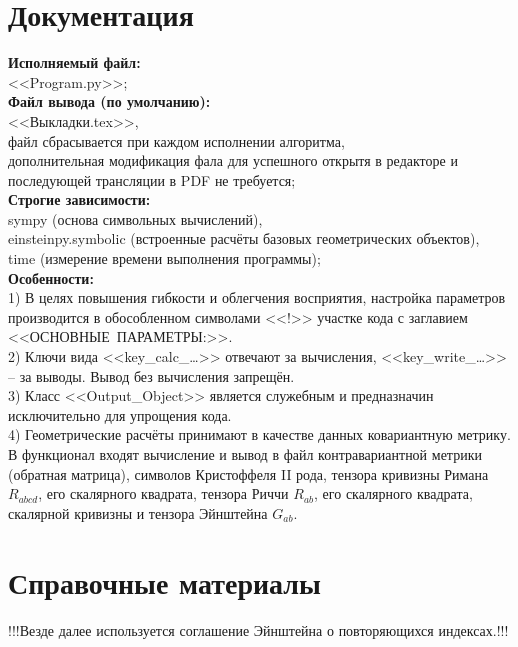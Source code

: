 \documentclass[a4paper, 10pt]{article}
\begin{document}
	
\section{Документация}
	\textbf{Исполняемый файл:}\\
	<<Program.py>>;\\
	\textbf{Файл вывода (по умолчанию):}\\ 
	<<Выкладки.tex>>,\\
	файл сбрасывается при каждом исполнении алгоритма,\\
	дополнительная модификация фала для успешного открытя в редакторе и последующей трансляции в PDF не требуется;\\
	\textbf{Строгие зависимости:}\\
	sympy (основа символьных вычислений),\\ 
	einsteinpy.symbolic (встроенные расчёты базовых геометрических объектов),\\ 
	time (измерение времени выполнения программы);\\
	\textbf{Особенности:}\\
	1) В целях повышения гибкости и облегчения восприятия, настройка параметров производится в обособленном символами <<!>> участке кода с заглавием \linebreak <<ОСНОВНЫЕ~ПАРАМЕТРЫ:>>.\\
	2) Ключи вида <<key\_calc\_\dots>> отвечают за вычисления, <<key\_write\_\dots>> -- за выводы. Вывод без вычисления запрещён.\\
	3) Класс <<Output\_Object>> является служебным и предназначин исключительно для упрощения кода.\\
	4) Геометрические расчёты принимают в качестве данных ковариантную метрику. В функционал входят вычисление и вывод в файл контравариантной метрики (обратная матрица), символов Кристоффеля II рода, тензора кривизны Римана $R_{abcd}$, его скалярного квадрата, тензора Риччи $R_{ab}$, его скалярного квадрата, скалярной кривизны и тензора Эйнштейна $G_{ab}$.
\section{Справочные материалы}
	!!!Везде далее используется соглашение Эйнштейна о повторяющихся индексах.!!!
\end{document}
